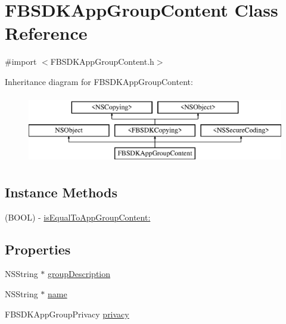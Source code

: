 \hypertarget{interface_f_b_s_d_k_app_group_content}{}\section{F\+B\+S\+D\+K\+App\+Group\+Content Class Reference}
\label{interface_f_b_s_d_k_app_group_content}


{\ttfamily \#import $<$F\+B\+S\+D\+K\+App\+Group\+Content.\+h$>$}

Inheritance diagram for F\+B\+S\+D\+K\+App\+Group\+Content\+:\begin{figure}[H]
\begin{center}
\leavevmode
\includegraphics[height=3.000000cm]{interface_f_b_s_d_k_app_group_content}
\end{center}
\end{figure}
\subsection*{Instance Methods}
\begin{DoxyCompactItemize}
\item 
(B\+O\+O\+L) -\/ \hyperlink{interface_f_b_s_d_k_app_group_content_a8b4c037d47575121d93be1dbb2643e09}{is\+Equal\+To\+App\+Group\+Content\+:}
\end{DoxyCompactItemize}
\subsection*{Properties}
\begin{DoxyCompactItemize}
\item 
N\+S\+String $\ast$ \hyperlink{interface_f_b_s_d_k_app_group_content_abb46868ac35b14093f032f25c53b8106}{group\+Description}
\item 
N\+S\+String $\ast$ \hyperlink{interface_f_b_s_d_k_app_group_content_a838919b863c4398e13315ec1bae8dd98}{name}
\item 
F\+B\+S\+D\+K\+App\+Group\+Privacy \hyperlink{interface_f_b_s_d_k_app_group_content_a8d405bc64a6c40dfbc5165dc524c37a7}{privacy}
\end{DoxyCompactItemize}


